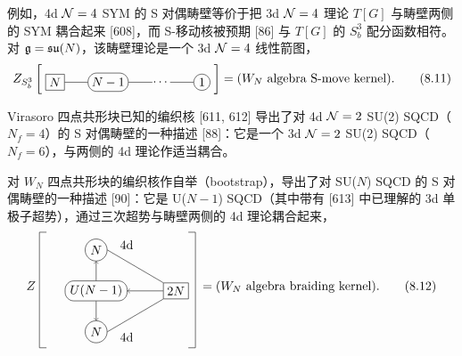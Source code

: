 例如，4d $\mathcal{N}=4$ SYM 的 S 对偶畴壁等价于把 3d $\mathcal{N}=4$ 理论 $T[G]$ 与畴壁两侧的 SYM 耦合起来 [608]，而 S-移动核被预期 [86] 与 $T[G]$ 的 $S^3_b$ 配分函数相符。对 $\mathfrak{g}=\mathfrak{su}(N)$，该畴壁理论是一个 3d $\mathcal{N}=4$ 线性箭图，
\begin{equation}
Z_{S^3_b}\left[\;
\begin{tikzpicture}[baseline=(current bounding box.center)]
  \node[draw,rectangle,inner sep=3pt] (a) at (0,0) {$N$};
  \node[draw,rounded corners=7pt,inner sep=3pt,minimum width=1.05cm,minimum height=0.52cm] (b) at (1.5,0) {$N-1$};
  \node (c) at (3.0,0) {$\cdots$};
  \node[draw,circle,inner sep=1pt,minimum size=0.46cm] (d) at (4.15,0) {$1$};
  \draw (a.east)--(b.west);
  \draw (b.east)--(2.75,0);
  \draw (3.25,0)--(d.west);
\end{tikzpicture}
\;\right]=(W_N\ \text{algebra S-move kernel}).
\tag{8.11}
\end{equation}

Virasoro 四点共形块已知的编织核 [611, 612] 导出了对 4d $\mathcal{N}=2$ SU(2) SQCD（$N_f=4$）的 S 对偶畴壁的一种描述 [88]：它是一个 3d $\mathcal{N}=2$ SU(2) SQCD（$N_f=6$），与两侧的 4d 理论作适当耦合。

对 $W_N$ 四点共形块的编织核作自举（bootstrap），导出了对 SU($N$) SQCD 的 S 对偶畴壁的一种描述 [90]：它是 U($N-1$) SQCD（其中带有 [613] 中已理解的 3d 单极子超势），通过三次超势与畴壁两侧的 4d 理论耦合起来，
\begin{equation}
Z\;
\begin{tikzpicture}[baseline=(current bounding box.center)]
  \node[draw,rounded corners=7pt,inner sep=3pt,minimum width=1.75cm,minimum height=0.55cm] (U) at (1.25,0.95) {$U(N-1)$};
  \node[draw,circle,inner sep=1pt,minimum size=0.62cm] (Nt) at (1.25,2.1) {$N$};
  \node[draw,circle,inner sep=1pt,minimum size=0.62cm] (Nb) at (1.25,-0.2) {$N$};
  \node[draw,rectangle,inner sep=3pt] (V) at (3.5,0.95) {$2N$};
  \draw[->] (U.north) -- (Nt.south);
  \draw[->] (U.south) -- (Nb.north);
  \draw[->] (V.west) -- (U.east);
  \draw (V.north west) -- (Nt.east);
  \draw (V.south west) -- (Nb.east);
  \node[anchor=west] at (1.8,2.25) {4d};
  \node[anchor=west] at (1.8,-0.35) {4d};
  \draw (-0.15,2.6) -- (-0.35,2.6) -- (-0.35,-0.65) -- (-0.15,-0.65);
  \draw (3.85,2.6) -- (4.05,2.6) -- (4.05,-0.65) -- (3.85,-0.65);
\end{tikzpicture}
\;=(W_N\ \text{algebra braiding kernel}).
\tag{8.12}
\end{equation}


